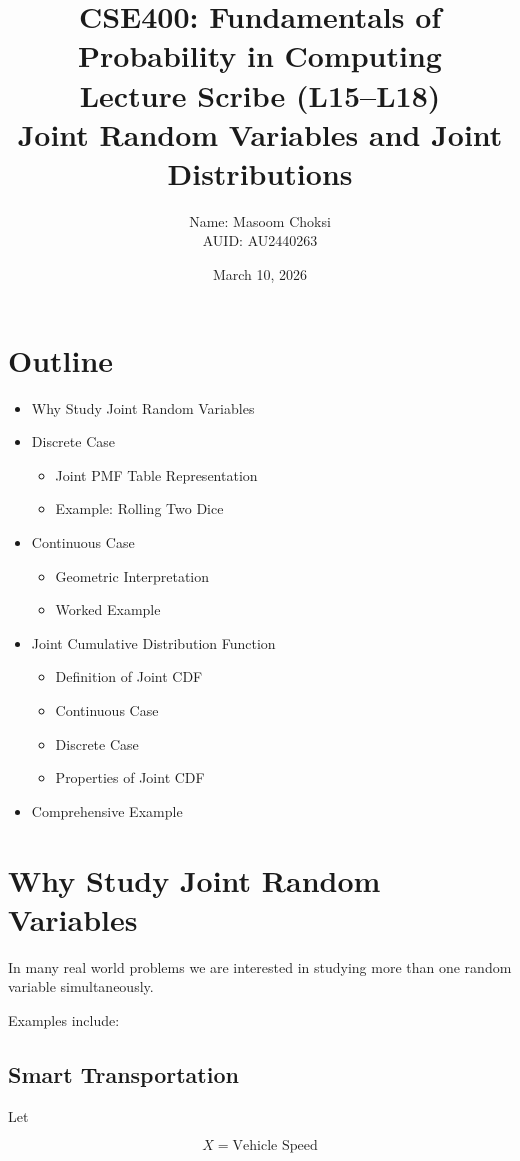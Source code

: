 \documentclass[11pt]{article}
\title{CSE400: Fundamentals of Probability in Computing\\
Lecture Scribe (L15--L18)\\
Joint Random Variables and Joint Distributions}
\author{Name: Masoom Choksi \\ AUID: AU2440263}
\date{March 10, 2026}
\begin{document}
\maketitle

\section{Outline}

\begin{itemize}
\item Why Study Joint Random Variables
\item Discrete Case
\begin{itemize}
\item Joint PMF Table Representation
\item Example: Rolling Two Dice
\end{itemize}
\item Continuous Case
\begin{itemize}
\item Geometric Interpretation
\item Worked Example
\end{itemize}
\item Joint Cumulative Distribution Function
\begin{itemize}
\item Definition of Joint CDF
\item Continuous Case
\item Discrete Case
\item Properties of Joint CDF
\end{itemize}
\item Comprehensive Example
\end{itemize}

\section{Why Study Joint Random Variables}

In many real world problems we are interested in studying more than one random variable simultaneously.

Examples include:

\subsection{Smart Transportation}

Let

\[
X = \text{Vehicle Speed}
\]
\end{document}
